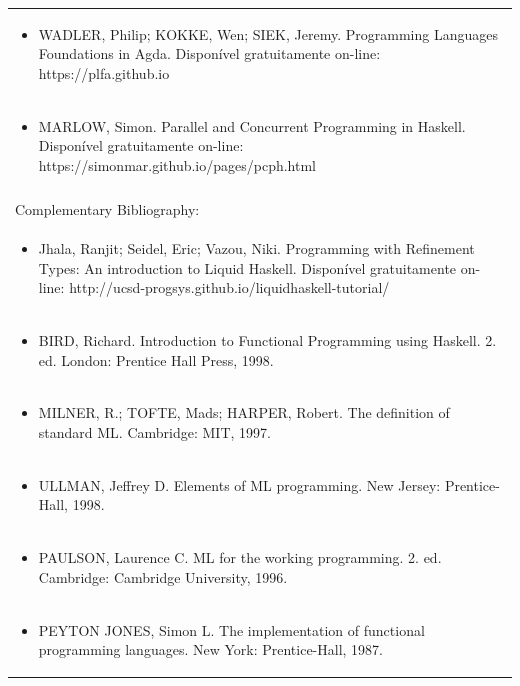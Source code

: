 \documentclass[11pt]{article}
\begin{document}
\begin{center}
\begin{longtable}{|p{4cm}|p{4cm}|p{4cm}|p{4cm}|}
\multicolumn{4}{|p{\dimexpr 16cm + 6\tabcolsep\relax}|}{\begin{itemize}\item WADLER, Philip; KOKKE, Wen; SIEK, Jeremy. Programming Languages Foundations in Agda. Disponível gratuitamente on-line: https://plfa.github.io\end{itemize}}\\
\multicolumn{4}{|p{\dimexpr 16cm + 6\tabcolsep\relax}|}{\begin{itemize}\item MARLOW, Simon. Parallel and Concurrent Programming in Haskell. Disponível gratuitamente on-line: https://simonmar.github.io/pages/pcph.html\end{itemize}}\\
\multicolumn{4}{|p{16cm}|}{}\\
\hline
\multicolumn{4}{|p{16cm}|}{Complementary Bibliography:}\\*
\multicolumn{4}{|p{\dimexpr 16cm + 6\tabcolsep\relax}|}{\begin{itemize}\item Jhala, Ranjit; Seidel, Eric; Vazou, Niki. Programming with Refinement Types: An introduction to Liquid Haskell. Disponível gratuitamente on-line: http://ucsd-progsys.github.io/liquidhaskell-tutorial/\end{itemize}}\\
\multicolumn{4}{|p{\dimexpr 16cm + 6\tabcolsep\relax}|}{\begin{itemize}\item BIRD, Richard. Introduction to Functional Programming using Haskell. 2. ed. London: Prentice Hall Press, 1998.\end{itemize}}\\
\multicolumn{4}{|p{\dimexpr 16cm + 6\tabcolsep\relax}|}{\begin{itemize}\item MILNER, R.; TOFTE, Mads; HARPER, Robert. The definition of standard ML. Cambridge: MIT, 1997.\end{itemize}}\\
\multicolumn{4}{|p{\dimexpr 16cm + 6\tabcolsep\relax}|}{\begin{itemize}\item ULLMAN, Jeffrey D. Elements of ML programming. New Jersey: Prentice-Hall, 1998.\end{itemize}}\\
\multicolumn{4}{|p{\dimexpr 16cm + 6\tabcolsep\relax}|}{\begin{itemize}\item PAULSON, Laurence C. ML for the working programming. 2. ed. Cambridge: Cambridge University, 1996.\end{itemize}}\\
\multicolumn{4}{|p{\dimexpr 16cm + 6\tabcolsep\relax}|}{\begin{itemize}\item PEYTON JONES, Simon L. The implementation of functional programming languages. New York: Prentice-Hall, 1987.\end{itemize}}\\
\hline
\end{longtable}
\end{center}
\end{document}
